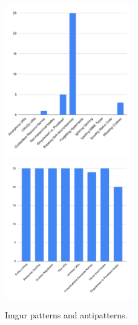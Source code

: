 \begin{figure}[htb!]

\includegraphics[width=0.5\textwidth]{img/barchart/imgurBarAnti.pdf}
\includegraphics[width=0.5\textwidth]{img/barchart/imgurBarPatt.pdf}
\caption{Imgur patterns and antipatterns.}
\label{fig:imgurBarPatt}

\end{figure}

